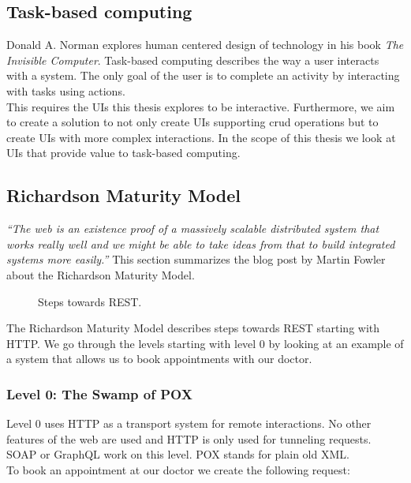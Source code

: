 \subsection{Task-based computing}
Donald A. Norman explores human centered design of technology in his book \textit{The Invisible Computer}. Task-based computing describes the way a user interacts with a system. The only goal of the user is to complete an activity by interacting with tasks using actions. \citep{invisiblecomputer} \\
This requires the UIs this thesis explores to be interactive. Furthermore, we aim to create a solution to not only create UIs supporting \gls{crud} operations but to create UIs with more complex interactions. In the scope of this thesis we look at UIs that provide value to task-based computing.

\subsection{Richardson Maturity Model}\label{richardsonmaturitymodel}
\textit{``The web is an existence proof of a massively scalable distributed system that works really well and we might be able to take ideas from that to build integrated systems more easily.''} \citep{richardsonmaturitymodel} This section summarizes the blog post by Martin Fowler about the Richardson Maturity Model.

\begin{figure}[!htb]
  \caption{Steps towards REST.}
\end{figure}

The Richardson Maturity Model describes steps towards REST starting with HTTP. We go through the levels starting with level 0 by looking at an example of a system that allows us to book appointments with our doctor.

\subsubsection{Level 0: The Swamp of POX}
Level 0 uses HTTP as a transport system for remote interactions. No other features of the web are used and HTTP is only used for tunneling requests. SOAP or GraphQL work on this level. POX stands for plain old XML. \\
To book an appointment at our doctor we create the following request:

